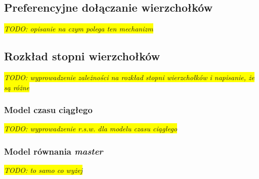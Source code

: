 \documentclass{article}
\newcommand{\todo}[1]{
	\colorbox{yellow} {{\color{red}
	\emph {TODO: #1}
}}}
\begin{document}
\subsection{Preferencyjne dołączanie wierzchołków}
	\todo{opisanie na czym polega ten mechanizm}
\subsection{Rozkład stopni wierzchołków}
	\todo{wyprowadzenie zależności na rozkład stopni wierzchołków i napisanie, że są różne}
\subsubsection{Model czasu ciągłego}
	\todo{wyprowadzenie r.s.w. dla modelu czasu ciągłego}
\subsubsection{Model równania \textit{master}}
	\todo{to samo co wyżej}
{}

\end{document}
